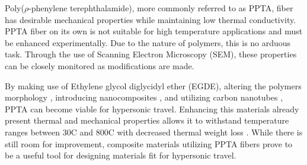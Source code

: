 \documentclass[12pt]{article}
\begin{document}
\indent Poly($\rho$-phenylene terephthalamide), more commonly referred to as PPTA, fiber has desirable mechanical properties while maintaining low thermal conductivity.\citep{LiTong2022} PPTA fiber on its own is not suitable for high temperature applications and must be enhanced experimentally. Due to the nature of polymers, this is no arduous task. Through the use of Scanning Electron Microscopy (SEM), these properties can be closely monitored as modifications are made. 

\indent By making use of Ethylene glycol diglycidyl ether (EGDE)\citep{LeiWang2017}, altering the polymers morphology \citep{Kanbargi2017}, introducing nanocomposites \citep{BoZhang2021}, and utilizing carbon nanotubes \citep{Yang2019}, PPTA can become viable for hypersonic travel. Enhancing this materials already present thermal and mechanical properties allows it to withstand temperature ranges between 30\degree C and 800\degree C with decreased thermal weight loss \citep{ShushengChen2014}. While there is still room for improvement, composite materials utilizing PPTA fibers prove to be a useful tool for designing materials fit for hypersonic travel.


 
\end{document}
